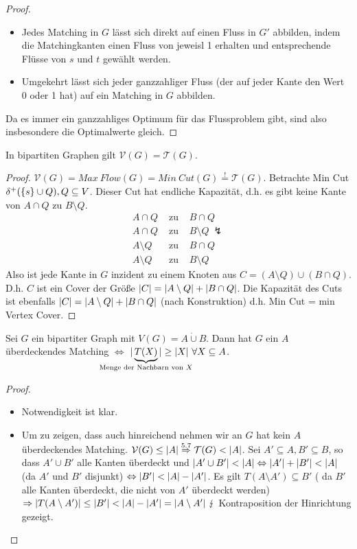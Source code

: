 \begin{proof}~
	\begin{itemize}
		\item Jedes Matching in $G$ lässt sich direkt auf einen Fluss in $G'$ abbilden, indem die Matchingkanten einen Fluss von jeweisl 1 erhalten und entsprechende Flüsse von $s$ und $t$ gewählt werden.
		\item Umgekehrt lässt sich jeder ganzzahliger Fluss (der auf jeder Kante den Wert 0 oder 1 hat) auf ein Matching in $G$ abbilden.
	\end{itemize}
	Da es immer ein ganzzahliges Optimum für das Flussproblem gibt, sind also insbesondere die Optimalwerte gleich.
\end{proof}
\begin{satz}
	In bipartiten Graphen gilt $\mathcal{V}(G) = \mathcal{T}(G)$.
\end{satz}
\begin{proof}
	$\mathcal{V}(G) = Max~Flow(G) = Min~Cut(G) \overset{!}{=} \mathcal{T}(G)$. Betrachte Min Cut $\delta^+(\{s\}\cup Q), Q \subseteq V$. Dieser Cut hat endliche Kapazität, d.h. es gibt keine Kante von $A \cap Q$ zu $B\setminus Q$.
	\begin{eqnarray*}
		A \cap Q & \text{ zu } & B \cap Q\\
		A \cap Q & \text{ zu } & B \setminus Q ~\lightning\\
		A \setminus Q & \text{ zu } & B \cap Q\\
		A \setminus Q & \text{ zu } & B \setminus Q
	\end{eqnarray*}
	Also ist jede Kante in $G$ inzident zu einem Knoten aus $C = (A\setminus Q)\cup (B \cap Q)$. D.h. $C$ ist ein Cover der Größe $\vert C \vert = \vert A\setminus Q \vert + \vert B\cap Q \vert$. Die Kapazität des Cuts ist ebenfalls $\vert C \vert = \vert A\setminus Q \vert + \vert B\cap Q \vert$ (nach Konstruktion) d.h. Min Cut = min Vertex Cover.
\end{proof}
\begin{satz}
	Sei $G$ ein bipartiter Graph mit $V(G)=A\dot\cup B$. Dann hat $G$ ein $A$ überdeckendes Matching $\Leftrightarrow$ $\card{\underbrace{T(X)}_{\mathclap{\text{Menge der Nachbarn von } X}}} \ge \card{X}~\forall X\subseteq A$.
\end{satz}
\begin{proof}~
	\begin{itemize}
		\item Notwendigkeit ist klar.
		\item Um zu zeigen, dass auch hinreichend nehmen wir an $G$ hat kein $A$ überdeckendes Matching. $\mathcal{V}(G) \le \vert A \vert \overset{5.7}{\Rightarrow} \mathcal{T}(G) < \vert A \vert$. Sei $A' \subseteq A, B' \subseteq B$, so dass $A' \cup B'$ alle Kanten überdeckt und $\vert A' \cup B' \vert < \vert A \vert \Leftrightarrow \vert A' \vert + \vert B' \vert < \vert A \vert$ (da $A'$ und $B'$ disjunkt) $\Leftrightarrow \vert B' \vert < \vert A \vert - \vert A' \vert$. Es gilt $T(A\setminus A') \subseteq B'$ ( da $B'$ alle Kanten überdeckt, die nicht von $A'$ überdeckt werden) $\Rightarrow \vert T(A\setminus A') \vert \le \vert B' \vert < \vert A \vert - \vert A' \vert = \vert A\setminus A' \vert~\lightning$ Kontraposition der Hinrichtung gezeigt.
	\end{itemize}
\end{proof}
